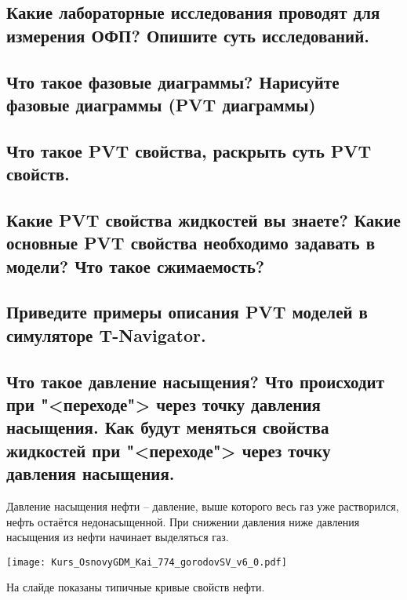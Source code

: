 \documentclass[main.tex]{subfiles}
\begin{document}
\subsection{Какие лабораторные исследования проводят для измерения ОФП? Опишите суть исследований.}

\newpage

\subsection{Что такое фазовые диаграммы? Нарисуйте фазовые диаграммы (PVT диаграммы)}

\newpage

\subsection{Что такое PVT свойства, раскрыть суть PVT свойств.}

\newpage

\subsection{Какие PVT свойства жидкостей вы знаете? Какие основные PVT свойства необходимо задавать в модели? Что такое сжимаемость?}

\newpage

\subsection{Приведите примеры описания PVT моделей в симуляторе T-Navigator.}

\newpage

\subsection{Что такое давление насыщения? Что происходит при "<переходе"> через точку давления насыщения. Как будут меняться свойства жидкостей при "<переходе"> через  точку давления насыщения.}

Давление насыщения нефти -- давление, выше которого весь газ уже растворился, нефть остаётся недонасыщенной.
При снижении давления ниже давления насыщения из нефти начинает выделяться газ.

\texttt{[image: Kurs\_OsnovyGDM\_Kai\_774\_gorodovSV\_v6\_0.pdf]}

На слайде показаны типичные кривые свойств нефти.
\\
\end{document}
